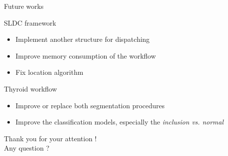 \documentclass{beamer}
\begin{document}
\begin{frame}{Future works}

	\begin{block}{SLDC framework}
		\begin{itemize}
			\item Implement another structure for dispatching
			\item Improve memory consumption of the workflow
			\item Fix location algorithm
		\end{itemize}
	\end{block}
		
	\begin{block}{Thyroid workflow}
		\begin{itemize}
			\item Improve or replace both segmentation procedures
			\item Improve the classification models, especially the \textit{inclusion vs. normal}
		\end{itemize}
	\end{block}
		
\end{frame}
\begin{frame}
	\vfill
	\begin{center}
		Thank you for your attention ! \\
		Any question ?
	\end{center}
	\vfill
\end{frame}
\end{document}
